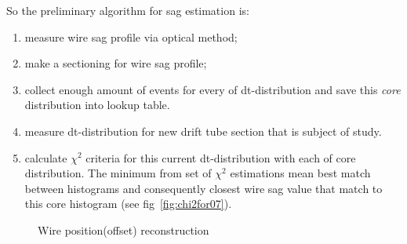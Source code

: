 \documentclass[]{article}
\begin{document}
	So the preliminary algorithm for sag estimation is:
	\begin{enumerate}
	\item measure wire sag profile via optical method;	
	\item make a sectioning for wire sag profile;
	\item collect enough amount of events for every of dt-distribution and save this {\it core} distribution into lookup table.
	\item measure dt-distribution for new drift tube section that is subject of study.
	\item calculate $\chi^2$ criteria for this current dt-distribution with each of core distribution. The minimum from set of $\chi^2$ estimations mean best match between histograms and consequently closest wire sag value that match to this core histogram (see fig~\ref{fig:chi2for07}).
	\end{enumerate}
	
	
	\begin{figure}[h!]
		\centering
		\qquad
		\caption{Wire position(offset) reconstruction}			
	\end{figure}	
\end{document}
